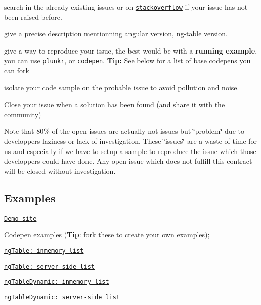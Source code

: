 \begin{DoxyEnumerate}
\item search in the already existing issues or on \href{http://stackoverflow.com/questions/tagged/ngtable?sort=newest&pageSize=30}{\tt stackoverflow} if your issue has not been raised before.
\item give a precise description mentionning angular version, ng-\/table version.
\item give a way to reproduce your issue, the best would be with a {\bfseries running example}, you can use \href{http://plnkr.co/}{\tt plunkr}, or \href{http://codepen.io/}{\tt codepen}. {\bfseries Tip\+:} See below for a list of base codepen\textquotesingle{}s you can fork
\item isolate your code sample on the probable issue to avoid pollution and noise.
\item Close your issue when a solution has been found (and share it with the community)
\end{DoxyEnumerate}

Note that 80\% of the open issues are actually not issues but \char`\"{}problem\char`\"{} due to developpers laziness or lack of investigation. These \char`\"{}issues\char`\"{} are a waste of time for us and especially if we have to setup a sample to reproduce the issue which those developpers could have done. Any open issue which does not fulfill this contract will be closed without investigation.

\subsection*{Examples}


\begin{DoxyItemize}
\item \href{http://ng-table.com/}{\tt Demo site}
\item Codepen examples ({\bfseries Tip}\+: fork these to create your own examples);
\begin{DoxyItemize}
\item \href{http://codepen.io/christianacca/pen/VLqVeo?editors=101}{\tt {\ttfamily ng\+Table}\+: inmemory list}
\item \href{http://codepen.io/christianacca/pen/VLqqjP?editors=101}{\tt {\ttfamily ng\+Table}\+: server-\/side list}
\item \href{http://codepen.io/christianacca/pen/jPxgzY?editors=101}{\tt {\ttfamily ng\+Table\+Dynamic}\+: inmemory list}
\item \href{http://codepen.io/christianacca/pen/JdwwrR/?editors=101}{\tt {\ttfamily ng\+Table\+Dynamic}\+: server-\/side list}
\end{DoxyItemize}
\end{DoxyItemize}

